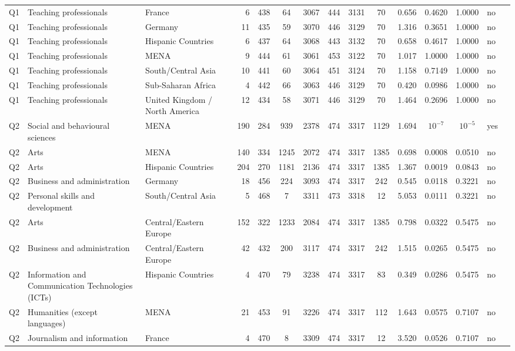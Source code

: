 \begin{longtable}{lllrcccccccccll}
Q1 & Teaching professionals & France & 6 & 438 & 64 & 3067 & 444 & 3131 & 70 & 0.656 & 0.4620 & 1.0000 & no \\
Q1 & Teaching professionals & Germany & 11 & 435 & 59 & 3070 & 446 & 3129 & 70 & 1.316 & 0.3651 & 1.0000 & no \\
Q1 & Teaching professionals & Hispanic Countries & 6 & 437 & 64 & 3068 & 443 & 3132 & 70 & 0.658 & 0.4617 & 1.0000 & no \\
Q1 & Teaching professionals & MENA & 9 & 444 & 61 & 3061 & 453 & 3122 & 70 & 1.017 & 1.0000 & 1.0000 & no \\
Q1 & Teaching professionals & South/Central Asia & 10 & 441 & 60 & 3064 & 451 & 3124 & 70 & 1.158 & 0.7149 & 1.0000 & no \\
Q1 & Teaching professionals & Sub-Saharan Africa & 4 & 442 & 66 & 3063 & 446 & 3129 & 70 & 0.420 & 0.0986 & 1.0000 & no \\
Q1 & Teaching professionals & United Kingdom / North America & 12 & 434 & 58 & 3071 & 446 & 3129 & 70 & 1.464 & 0.2696 & 1.0000 & no \\
Q2 & Social and behavioural sciences & MENA & 190 & 284 & 939 & 2378 & 474 & 3317 & 1129 & 1.694 & $10^{-7}$ & $10^{-5}$ & yes \\
Q2 & Arts & MENA & 140 & 334 & 1245 & 2072 & 474 & 3317 & 1385 & 0.698 & 0.0008 & 0.0510 & no \\
Q2 & Arts & Hispanic Countries & 204 & 270 & 1181 & 2136 & 474 & 3317 & 1385 & 1.367 & 0.0019 & 0.0843 & no \\
Q2 & Business and administration & Germany & 18 & 456 & 224 & 3093 & 474 & 3317 & 242 & 0.545 & 0.0118 & 0.3221 & no \\
Q2 & Personal skills and development & South/Central Asia & 5 & 468 & 7 & 3311 & 473 & 3318 & 12 & 5.053 & 0.0111 & 0.3221 & no \\
Q2 & Arts & Central/Eastern Europe & 152 & 322 & 1233 & 2084 & 474 & 3317 & 1385 & 0.798 & 0.0322 & 0.5475 & no \\
Q2 & Business and administration & Central/Eastern Europe & 42 & 432 & 200 & 3117 & 474 & 3317 & 242 & 1.515 & 0.0265 & 0.5475 & no \\
Q2 & Information and Communication Technologies (ICTs) & Hispanic Countries & 4 & 470 & 79 & 3238 & 474 & 3317 & 83 & 0.349 & 0.0286 & 0.5475 & no \\
Q2 & Humanities (except languages) & MENA & 21 & 453 & 91 & 3226 & 474 & 3317 & 112 & 1.643 & 0.0575 & 0.7107 & no \\
Q2 & Journalism and information & France & 4 & 470 & 8 & 3309 & 474 & 3317 & 12 & 3.520 & 0.0526 & 0.7107 & no \\

\end{longtable}
